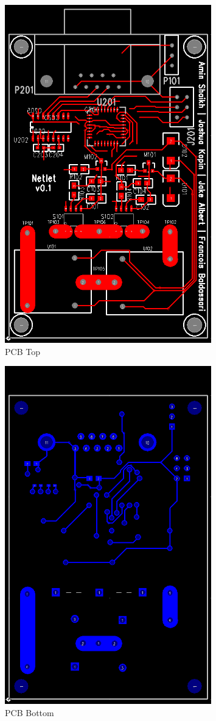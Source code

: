 \begin{figure}[H]
\centering
\includegraphics[width=0.8\textwidth,viewport=0 0 529 864]{figures/pcbtop.png}
\caption{PCB Top}
\label{fig:pcbtop}
\end{figure}

\begin{figure}[H]
\centering
\includegraphics[width=0.8\textwidth,viewport=0 0 529 864]{figures/pcbbot.png}
\caption{PCB Bottom}
\label{fig:pcbbot}
\end{figure}